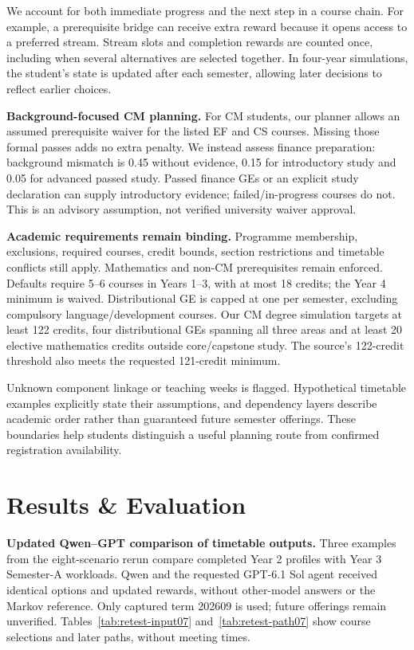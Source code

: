\documentclass{article}
\begin{document}
We account for both immediate progress and the next step in a course chain. For example, a prerequisite bridge can receive extra reward because it opens access to a preferred stream. Stream slots and completion rewards are counted once, including when several alternatives are selected together. In four-year simulations, the student's state is updated after each semester, allowing later decisions to reflect earlier choices.


\textbf{Background-focused CM planning.} For CM students, our planner allows an assumed prerequisite waiver for the listed EF and CS courses. Missing those formal passes adds no extra penalty. We instead assess finance preparation: background mismatch is 0.45 without evidence, 0.15 for introductory study and 0.05 for advanced passed study. Passed finance GEs or an explicit study declaration can supply introductory evidence; failed/in-progress courses do not. This is an advisory assumption, not verified university waiver approval.

\textbf{Academic requirements remain binding.} Programme membership, exclusions, required courses, credit bounds, section restrictions and timetable conflicts still apply. Mathematics and non-CM prerequisites remain enforced. Defaults require 5--6 courses in Years 1--3, with at most 18 credits; the Year 4 minimum is waived. Distributional GE is capped at one per semester, excluding compulsory language/development courses. Our CM degree simulation targets at least 122 credits, four distributional GEs spanning all three areas and at least 20 elective mathematics credits outside core/capstone study. The source's 122-credit threshold also meets the requested 121-credit minimum.

Unknown component linkage or teaching weeks is flagged. Hypothetical timetable examples explicitly state their assumptions, and dependency layers describe academic order rather than guaranteed future semester offerings. These boundaries help students distinguish a useful planning route from confirmed registration availability.

\newpage
\section{Results \& Evaluation}

\textbf{Updated Qwen--GPT comparison of timetable outputs.} Three examples from the eight-scenario rerun compare completed Year 2 profiles with Year 3 Semester-A workloads. Qwen and the requested GPT-6.1 Sol agent received identical options and updated rewards, without other-model answers or the Markov reference. Only captured term 202609 is used; future offerings remain unverified. Tables~\ref{tab:retest-input07} and~\ref{tab:retest-path07} show course selections and later paths, without meeting times.
\end{document}
